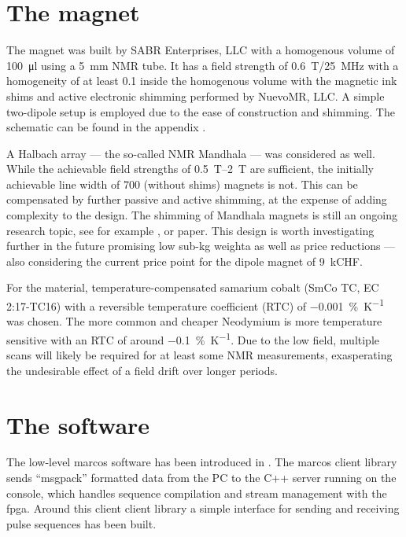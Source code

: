 \section{The magnet}
The magnet was built by SABR Enterprises, LLC with a homogenous volume of \qty{100}{\micro\litre} using a \qty{5}{\milli\metre} NMR tube. It has a field strength of \qty{0.6}{\tesla}/\qty{25}{\mega\hertz} with a homogeneity of at least \qty{0.1}{\partspermillion} inside the homogenous volume with the magnetic ink shims and active electronic shimming performed by NuevoMR, LLC. A simple two-dipole setup is employed due to the ease of construction and shimming. The schematic can be found in the appendix .

A Halbach array --- the so-called NMR Mandhala --- was considered as well. While the achievable field strengths of \qtyrange{0.5}{2}{\tesla}  are sufficient, the initially achievable line width of \qty{700}{\partspermillion} \cite{raichDesignConstructionDipolar2004} (without shims) magnets is not. This can be compensated by further passive and active shimming, at the expense of adding complexity to the design. The shimming of Mandhala magnets is still an ongoing research topic, see for example ,  or  paper. This design is worth investigating further in the future promising low sub-kg weighta as well as price reductions --- also considering the current price point for the dipole magnet of \approx \qty{9}{kCHF}.

For the material, temperature-compensated samarium cobalt (SmCo TC, EC 2:17-TC16) with a reversible temperature coefficient (RTC) of \qty{-0.001}{\%\per\kelvin} was chosen. The more common and cheaper Neodymium is more temperature sensitive with an RTC of around \qty{-0.1}{\%\per\kelvin}. Due to the low field, multiple scans will likely be required for at least some NMR measurements, exasperating the undesirable effect of a field drift over longer periods.

\section{The software}
The low-level \gls{marcos} software has been introduced in . The \gls{marcos} client library sends \enquote{msgpack} formatted data from the PC to the C++ server running on the console, which handles sequence compilation and stream management with the \acrshort{fpga}. Around this client client library a simple interface for sending and receiving pulse sequences has been built.

